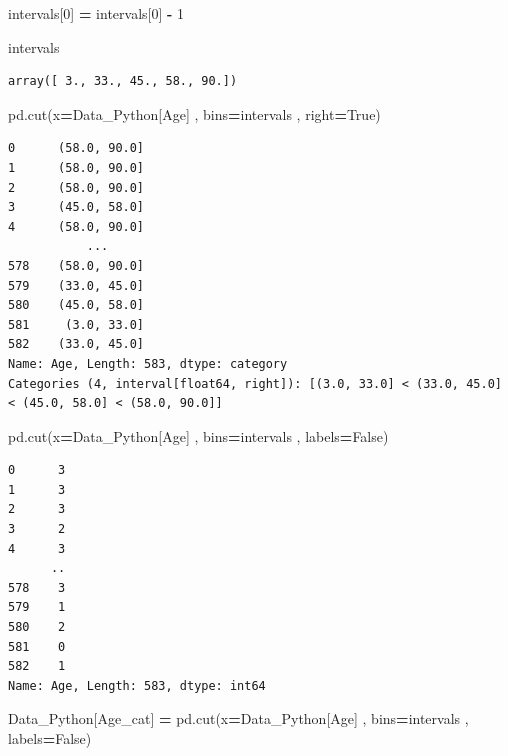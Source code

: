 \documentclass[
  11pt,
  a4paper,
]{article}
\newenvironment{Shaded}{\begin{snugshade}}{\end{snugshade}}
\newcommand{\DecValTok}[1]{\textcolor[rgb]{0.00,0.00,0.81}{#1}}
\newcommand{\NormalTok}[1]{#1}
\newcommand{\OperatorTok}[1]{\textcolor[rgb]{0.81,0.36,0.00}{\textbf{#1}}}
\newcommand{\StringTok}[1]{\textcolor[rgb]{0.31,0.60,0.02}{#1}}
\newcommand{\VariableTok}[1]{\textcolor[rgb]{0.00,0.00,0.00}{#1}}
\begin{document}
\begin{Shaded}
\begin{Highlighting}[]
\NormalTok{intervals[}\DecValTok{0}\NormalTok{] }\OperatorTok{=}\NormalTok{  intervals[}\DecValTok{0}\NormalTok{] }\OperatorTok{{-}} \DecValTok{1}

\NormalTok{intervals}
\end{Highlighting}
\end{Shaded}

\begin{verbatim}
array([ 3., 33., 45., 58., 90.])
\end{verbatim}

\begin{Shaded}
\begin{Highlighting}[]
\NormalTok{pd.cut(x}\OperatorTok{=}\NormalTok{Data\_Python[}\StringTok{\textquotesingle{}Age\textquotesingle{}}\NormalTok{] , bins}\OperatorTok{=}\NormalTok{intervals , right}\OperatorTok{=}\VariableTok{True}\NormalTok{)}
\end{Highlighting}
\end{Shaded}

\begin{verbatim}
0      (58.0, 90.0]
1      (58.0, 90.0]
2      (58.0, 90.0]
3      (45.0, 58.0]
4      (58.0, 90.0]
           ...     
578    (58.0, 90.0]
579    (33.0, 45.0]
580    (45.0, 58.0]
581     (3.0, 33.0]
582    (33.0, 45.0]
Name: Age, Length: 583, dtype: category
Categories (4, interval[float64, right]): [(3.0, 33.0] < (33.0, 45.0] < (45.0, 58.0] < (58.0, 90.0]]
\end{verbatim}

\begin{Shaded}
\begin{Highlighting}[]
\NormalTok{pd.cut(x}\OperatorTok{=}\NormalTok{Data\_Python[}\StringTok{\textquotesingle{}Age\textquotesingle{}}\NormalTok{] , bins}\OperatorTok{=}\NormalTok{intervals , labels}\OperatorTok{=}\VariableTok{False}\NormalTok{)}
\end{Highlighting}
\end{Shaded}

\begin{verbatim}
0      3
1      3
2      3
3      2
4      3
      ..
578    3
579    1
580    2
581    0
582    1
Name: Age, Length: 583, dtype: int64
\end{verbatim}

\vspace{0.1cm}

\begin{Shaded}
\begin{Highlighting}[]
\NormalTok{Data\_Python[}\StringTok{\textquotesingle{}Age\_cat\textquotesingle{}}\NormalTok{] }\OperatorTok{=}\NormalTok{ pd.cut(x}\OperatorTok{=}\NormalTok{Data\_Python[}\StringTok{\textquotesingle{}Age\textquotesingle{}}\NormalTok{] , bins}\OperatorTok{=}\NormalTok{intervals , labels}\OperatorTok{=}\VariableTok{False}\NormalTok{)}
\end{Highlighting}
\end{Shaded}
\end{document}
